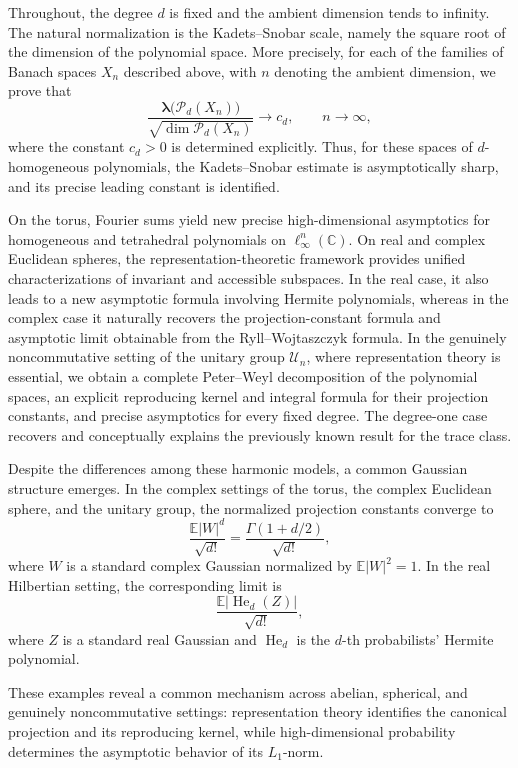 \documentclass[11pt,showkeys]{amsart}
\begin{document}
Throughout, the degree $d$ is fixed and the ambient dimension tends to
infinity. The natural normalization is the Kadets--Snobar scale, namely the
square root of the dimension of the polynomial space. More precisely, for each of the families of Banach spaces $X_n$ described above, with $n$ denoting the ambient dimension, we prove that
$$
\frac{\boldsymbol\lambda\bigl(\mathcal P_d(X_n)\bigr)}
{\sqrt{\dim \mathcal P_d(X_n)}}
\longrightarrow c_d,
\qquad n\to\infty,
$$
where the constant $c_d>0$ is determined explicitly.
 Thus, for these spaces
of $d$-homogeneous polynomials, the Kadets--Snobar estimate is
asymptotically sharp, and its precise leading constant is identified.


On the torus, Fourier sums yield new precise high-dimensional asymptotics for
homogeneous and tetrahedral polynomials on $\ell_\infty^n(\mathbb C)$. On real and complex Euclidean spheres, the representation-theoretic
framework provides unified characterizations of invariant and
accessible subspaces. In the real
case, it also leads to a new asymptotic formula involving Hermite polynomials,
whereas in the complex case it naturally recovers the projection-constant
formula and asymptotic limit obtainable from the Ryll--Wojtaszczyk formula.
In the genuinely noncommutative setting of the unitary group
\(\mathcal U_n\), where representation theory is essential, we obtain
a complete Peter--Weyl decomposition of the polynomial spaces, an
explicit reproducing kernel and integral formula for their projection
constants, and precise asymptotics for every fixed degree.
The degree-one case recovers and conceptually explains the
previously known result for the trace class.

Despite the differences among these harmonic models, a common Gaussian
structure emerges. In the complex settings of the torus, the complex
Euclidean sphere, and the unitary group, the normalized projection constants
converge to
$$
\frac{\mathbb E |W|^d}{\sqrt{d!}}
=
\frac{\Gamma(1+d/2)}{\sqrt{d!}},
$$
where $W$ is a standard complex Gaussian normalized by
$\mathbb E|W|^2=1$. In the real Hilbertian setting, the corresponding limit is
$$
\frac{\mathbb E |\operatorname{He}_d(Z)|}{\sqrt{d!}},
$$
where $Z$ is a standard real Gaussian and $\operatorname{He}_d$ is the
$d$-th probabilists' Hermite polynomial.


These examples reveal a common mechanism across abelian, spherical, and
genuinely noncommutative settings: representation theory identifies the
canonical projection and its reproducing kernel, while high-dimensional
probability determines the asymptotic behavior of its $L_1$-norm.
\end{document}
